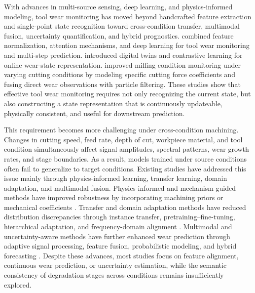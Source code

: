 \documentclass[a4paper,fleqn]{cas-sc}
\begin{document}
With advances in multi-source sensing, deep learning, and physics-informed modeling, tool wear monitoring has moved beyond handcrafted feature extraction and single-point state recognition toward cross-condition transfer, multimodal fusion, uncertainty quantification, and hybrid prognostics. \citet{ref5} combined feature normalization, attention mechanisms, and deep learning for tool wear monitoring and multi-step prediction. \citet{ref36} introduced digital twins and contrastive learning for online wear-state representation. \citet{ref1,ref2} improved milling condition monitoring under varying cutting conditions by modeling specific cutting force coefficients and fusing direct wear observations with particle filtering. These studies show that effective tool wear monitoring requires not only recognizing the current state, but also constructing a state representation that is continuously updateable, physically consistent, and useful for downstream prediction.

This requirement becomes more challenging under cross-condition machining. Changes in cutting speed, feed rate, depth of cut, workpiece material, and tool condition simultaneously affect signal amplitudes, spectral patterns, wear growth rates, and stage boundaries. As a result, models trained under source conditions often fail to generalize to target conditions. Existing studies have addressed this issue mainly through physics-informed learning, transfer learning, domain adaptation, and multimodal fusion. Physics-informed and mechanism-guided methods have improved robustness by incorporating machining priors or mechanical coefficients \citep{ref15,ref16,ref24,ref9}. Transfer and domain adaptation methods have reduced distribution discrepancies through instance transfer, pretraining--fine-tuning, hierarchical adaptation, and frequency-domain alignment \citep{ref23,ref41,ref31,ref22}. Multimodal and uncertainty-aware methods have further enhanced wear prediction through adaptive signal processing, feature fusion, probabilistic modeling, and hybrid forecasting \citep{ref12,ref42,ref30,ref39}. Despite these advances, most studies focus on feature alignment, continuous wear prediction, or uncertainty estimation, while the semantic consistency of degradation stages across conditions remains insufficiently explored.
\end{document}
